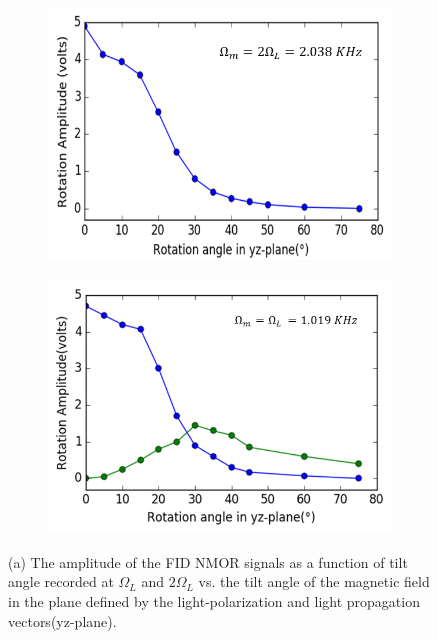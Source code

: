 \begin{figure}
    \centering
   \begin{subfigure}[b]{0.45\textwidth}
        \includegraphics[width=\textwidth]{figures/tilt_y_larmor.png}
        \caption{}
        \label{fig:tilt_y}
    \end{subfigure}
    \hfill
     \begin{subfigure}[b]{0.45\textwidth}
        \centering
        \includegraphics[width=\textwidth]{figures/tilt_y_2larmor.png}
        \caption{}
        \label{fig:tilt_x}
    \end{subfigure}
    \caption{(a) The amplitude of the FID NMOR signals as a function
      of tilt angle recorded at $\Omega_L$ and $2\Omega_L$ vs. the
      tilt angle of the magnetic field in the plane defined by the
      light-polarization and light propagation vectors(yz-plane). \label{fig:something-tilted}}
\end{figure}

